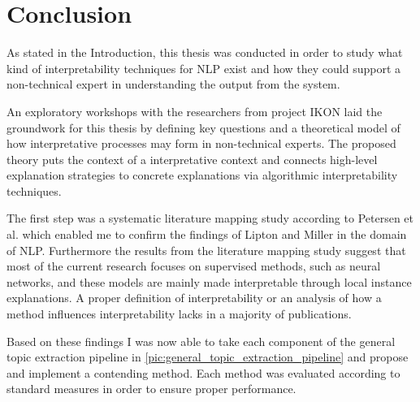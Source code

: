 %
\chapter{Conclusion}
\label{chap:conclusion}

As stated in the Introduction, this thesis was conducted in order to study what kind of interpretability techniques for NLP exist and how they could support a non-technical expert in understanding the output from the system.

An exploratory workshops with the researchers from project IKON laid the groundwork for this thesis by defining key questions and a theoretical model of how interpretative processes may form in non-technical experts. The proposed theory puts the context of a interpretative context and connects high-level explanation strategies to concrete explanations via algorithmic interpretability techniques.

The first step was a systematic literature mapping study according to Petersen et al. \cite{petersenSystematicMappingStudies} which enabled me to confirm the findings of Lipton \cite{liptonMythosModelInterpretability2016a} and Miller \cite{millerExplanationArtificialIntelligence2017} in the domain of NLP.
Furthermore the results from the literature mapping study suggest that most of the current research focuses on supervised methods, such as neural networks, and these models are mainly made interpretable through local instance explanations. A proper definition of interpretability or an analysis of how a method influences interpretability lacks in a majority of publications.

Based on these findings I was now able to take each component of the general topic extraction pipeline in \autoref{pic:general_topic_extraction_pipeline} and propose and implement a contending method. Each method was evaluated according to standard measures in order to ensure proper performance.

